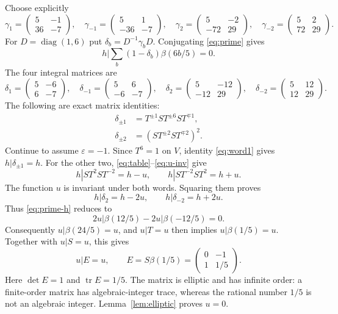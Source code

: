 \documentclass[11pt]{article}
\theoremstyle{remark}
\newcommand{\eps}{\varepsilon}
\newcommand{\bb}{\beta}
\begin{document}
Choose explicitly
\[
 \gamma_1=\begin{pmatrix}5&-1\\36&-7\end{pmatrix},\quad
 \gamma_{-1}=\begin{pmatrix}5&1\\-36&-7\end{pmatrix},\quad
 \gamma_2=\begin{pmatrix}5&-2\\-72&29\end{pmatrix},\quad
 \gamma_{-2}=\begin{pmatrix}5&2\\72&29\end{pmatrix}.
\]
For $D=\operatorname{diag}(1,6)$ put $\delta_b=D^{-1}\gamma_bD$.
Conjugating \eqref{eq:prime} gives
\begin{equation}\label{eq:prime-h}
 h\bigg|\sum_b(1-\delta_b)\bb(6b/5)=0.
\end{equation}
The four integral matrices are
\[
 \delta_1=\begin{pmatrix}5&-6\\6&-7\end{pmatrix},\quad
 \delta_{-1}=\begin{pmatrix}5&6\\-6&-7\end{pmatrix},\quad
 \delta_2=\begin{pmatrix}5&-12\\-12&29\end{pmatrix},\quad
 \delta_{-2}=\begin{pmatrix}5&12\\12&29\end{pmatrix}.
\]
The following are exact matrix identities:
\begin{align}
 \delta_{\pm1}&=T^{\pm1}ST^{\pm6}ST^{\mp1},\label{eq:word1}\\
 \delta_{\pm2}&=(ST^{\pm2}ST^{\mp2})^2.\label{eq:word2}
\end{align}
Continue to assume $\eps=-1$.  Since $T^6=1$ on $V$, identity
\eqref{eq:word1} gives $h|\delta_{\pm1}=h$.  For the other two,
\eqref{eq:table}--\eqref{eq:u-inv} give
\[
 h|ST^2ST^{-2}=h-u,\qquad
 h|ST^{-2}ST^2=h+u.
\]
The function $u$ is invariant under both words.  Squaring them proves
\begin{equation}\label{eq:defects}
 h|\delta_2=h-2u,\qquad h|\delta_{-2}=h+2u.
\end{equation}
Thus \eqref{eq:prime-h} reduces to
\[
 2u|\bb(12/5)-2u|\bb(-12/5)=0.
\]
Consequently $u|\bb(24/5)=u$, and $u|T=u$ then implies
$u|\bb(1/5)=u$.  Together with $u|S=u$, this gives
\[
 u|E=u,\qquad E=S\bb(1/5)=\begin{pmatrix}0&-1\\1&1/5\end{pmatrix}.
\]
Here $\det E=1$ and $\operatorname{tr}E=1/5$.  The matrix is elliptic
and has infinite order: a finite-order matrix has algebraic-integer
trace, whereas the rational number $1/5$ is not an algebraic integer.
Lemma~\ref{lem:elliptic} proves $u=0$.
\end{document}
